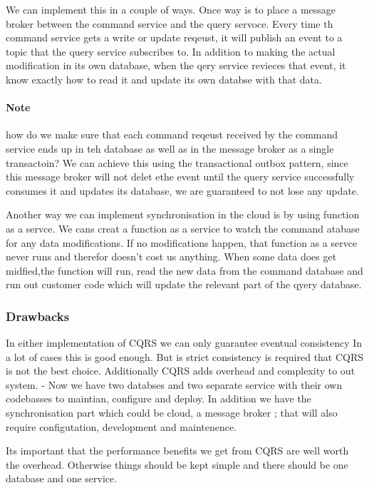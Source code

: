 \documentclass[a4paper, 11pt]{book}
\begin{document}
{    We can implement this in a couple of ways.
    Once way is to place a message broker between the command service and the query servoce.
    Every time th command service gets a write or update reqeust, it will publish an event to a topic that the query service subscribes to.
    In addition to making the actual modification in its own database, when the qery service revieces that event, it know exactly how to read it and update its own databse with that data.

    \paragraph{Note}
    how do we make sure that each command reqeust received by the command service ends up in teh database as well as in the message broker as a single transactoin?
    We can achieve this using the transactional outbox pattern, since this message broker will not delet ethe event until the query service successfully consumes it and updates its database, we are guaranteed to not lose any update.

    Another way we can implement synchronisation in the cloud is by using function as a servce.
    We cans creat a function as a service to watch the command atabase for any data modifications.
    If no modifications happen, that function as a servce never runs and therefor doesn't cost us anything.
    When some data does get midfied,the function will run, read the new data from the command database and run out customer code which will update the relevant part of the qyery database.

    \subsubsection{Drawbacks}
    In either implementation of CQRS we can only guarantee eventual consistency
    In a lot of cases this is good enough.
    But is strict consistency is required that CQRS is not the best choice.
    Additionally CQRS adds overhead and complexity to out system.
    - Now we have two databses and two separate service with their own codebasses to maintian, configure and deploy.
    In addition we have the synchronisation part which could be cloud, a message broker ; that will also require configutation, development and maintenence.

    Its important that the performance benefits we get from CQRS are well worth the overhead.
    Otherwise things should be kept simple and there should be one database and one service.

}
\end{document}
